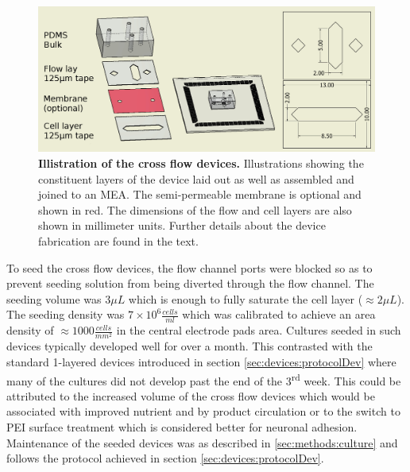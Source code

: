  \begin{figure}[h]
       \centering
       \includegraphics[width=12cm]{chapter5/figures/crossFlowIllustration/crossFlowIllustration.jpg}
       \caption[Illustration of the cross flow devices used for measuring culture activity under flow]{\textbf{Illistration of the cross flow devices.} Illustrations showing the constituent layers of the device laid out as well as assembled and joined to an MEA. The semi-permeable membrane is optional and shown in red. The dimensions of the flow and cell layers are also shown in millimeter units. Further details about the device fabrication are found in the text.}
       \label{fig:crossFlow:crossFlowIllustration}
  \end{figure}

To seed the cross flow devices, the flow channel ports were blocked so as to prevent seeding solution from being diverted through the flow channel. The seeding volume was \(3 \mu L\) which is enough to fully saturate the cell layer (\(\approx 2 \mu L\)). The seeding density was \(7\times 10^6\frac{cells}{ml}\) which was calibrated to achieve an area density of \(\approx 1000 \frac{cells}{mm^2}\) in the central electrode pads area. Cultures seeded in such devices typically developed well for over a month. This contrasted with the standard 1-layered devices introduced in section \ref{sec:devices:protocolDev} where many of the cultures did not develop past the end of the 3\textsuperscript{rd} week. This could be attributed to the increased volume of the cross flow devices which would be associated with improved nutrient and by product circulation or to the switch to PEI surface treatment which is considered better for neuronal adhesion. Maintenance of the seeded devices was as described in \ref{sec:methods:culture} and follows the protocol achieved in section \ref{sec:devices:protocolDev}.



